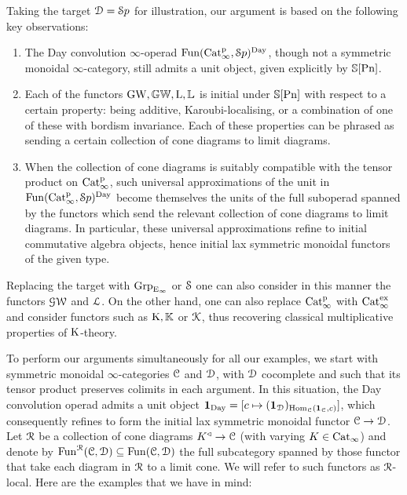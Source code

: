 Taking the target $\mathcal{D}={\mathcal Sp}$ for illustration, our argument is based on the following key observations:
\begin{enumerate}
\item
The Day convolution $\infty$-operad $\operatorname{Fun}(\mathrm{Cat}^{\mathrm p}_\infty,{\mathcal Sp})^{\mathrm{Day}}$, though not a symmetric monoidal $\infty$-category, still admits a unit object, given explicitly by $\mathbb{S}[\mathrm{Pn}]$.
\item
Each of the functors $\operatorname{GW},\mathbb{GW},\operatorname L,\mathbb{L}$ is initial under $\mathbb{S}[\mathrm{Pn}]$ with respect to a certain property: being additive, Karoubi-localising, or a combination of one of these with bordism invariance. Each of these properties can be phrased as sending a certain collection of cone diagrams to limit diagrams.
\item
When the collection of cone diagrams is suitably compatible with the tensor product on $\mathrm{Cat}^{\mathrm p}_\infty$, such universal approximations of the unit in $\operatorname{Fun}(\mathrm{Cat}^{\mathrm p}_\infty,{\mathcal Sp})^{\mathrm{Day}}$ become themselves the units of the full suboperad spanned by the functors which send the relevant collection of cone diagrams to limit diagrams. In particular, these universal approximations refine to initial commutative algebra objects, hence initial lax symmetric monoidal functors of the given type. %
\end{enumerate}
Replacing the target with $\operatorname{Grp}_{{\mathrm{E}_{\infty}}}$ or $\mathcal S$ one can also consider in this manner the functors $\operatorname{\mathcal{GW}}$ and $\operatorname{\mathcal{L}}$. On the other hand, one can also replace $\mathrm{Cat}^{\mathrm p}_\infty$ with $\mathrm{Cat}_\infty^{\mathrm{ex}}$ and consider functors such as $\operatorname K,\mathbb K$ or $\operatorname{\mathcal{K}}$, thus recovering classical multiplicative properties of $\operatorname K$-theory.

To perform our arguments simultaneously for all our examples, we start with symmetric monoidal $\infty$-categories $\mathcal C$ and $\mathcal{D}$, %
with $\mathcal{D}$ cocomplete and such that its tensor product preserves colimits in each argument. 
In this situation, the Day convolution operad admits a unit object $\mathbf{1}_{\mathrm{Day}} = [c \mapsto (\mathbf{1}_{\mathcal{D}})_{\operatorname{Hom}_\mathcal C(\mathbf{1}_\mathcal C, c)}]$, which consequently refines to form the initial lax symmetric monoidal functor $\mathcal C \to \mathcal{D}$. 
Let $\mathcal{R}$ be a collection of cone diagrams $K^{\triangleleft} \rightarrow \mathcal C$ (with varying $K \in \mathrm{Cat}_\infty$) and denote by $\operatorname{Fun}^{\mathcal{R}}(\mathcal C,\mathcal{D}) \subseteq \operatorname{Fun}(\mathcal C,\mathcal{D})$ the full subcategory spanned by those functor that take each diagram in $\mathcal{R}$ to a limit cone. We will refer to such functors as $\mathcal{R}$-local.
Here are the examples that we have in mind:


